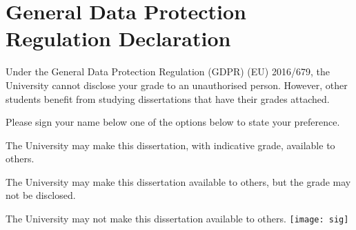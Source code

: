 
\section*{General Data Protection Regulation Declaration}
\vspace{0.5cm}
\begin{flushleft}
Under the General Data Protection Regulation (GDPR) (EU) 2016/679, the University cannot disclose your grade to an unauthorised person. However, other students benefit from studying dissertations that have their grades attached. \newline

\vspace{0.5cm}

Please sign your name below one of the options below to state your preference.\newline
\vspace{0.5cm}

The University may make this dissertation, with indicative grade, available to others.\newline
\vspace{3cm}


The University may make this dissertation available to others, but the grade may not be disclosed.\newline
\vspace{3cm}


The University may not make this dissertation available to others.\newline
\texttt{[image: sig]}
\end{flushleft}


